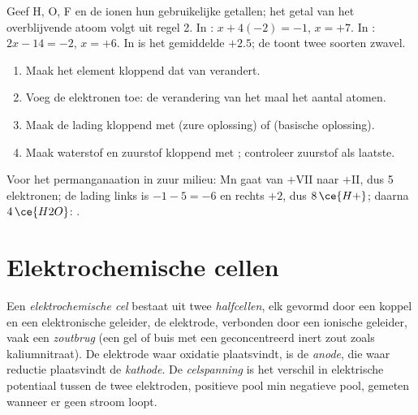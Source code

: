 \begin{method}\label{met:b1:nernst:oxidation-numbers}
Geef H, O, F en de ionen hun gebruikelijke getallen; het getal van het
overblijvende atoom volgt uit regel 2. In : $x + 4(-2) = -1$,
$x = +7$. In : $2x - 14 = -2$, $x = +6$. In  is
het gemiddelde $+2.5$; de  toont twee soorten zwavel.
\end{method}

\begin{method}\label{met:b1:nernst:balance-by-on}
\begin{enumerate}
  \item Maak het element kloppend dat van  verandert.
  \item Voeg de elektronen toe: de verandering van het  maal
        het aantal atomen.
  \item Maak de lading kloppend met  (zure oplossing) of 
        (basische oplossing).
  \item Maak waterstof en zuurstof kloppend met ; controleer
        zuurstof als laatste.
\end{enumerate}
Voor het permanganaation in zuur milieu: Mn gaat van $+$VII naar $+$II,
dus 5 elektronen; de lading links is $-1 - 5 = -6$ en rechts $+2$, dus
$8\,\ce{H+}$; daarna $4\,\ce{H2O}$:
.
\end{method}

\section{Elektrochemische cellen}

\begin{definition}\label{def:b1:nernst:cell}
Een \emph{elektrochemische cel} bestaat uit
twee \emph{halfcellen}, elk gevormd door een koppel en een
elektronische geleider, de elektrode, verbonden door een ionische
geleider, vaak een \emph{zoutbrug} (een gel of buis met
een geconcentreerd inert zout zoals kaliumnitraat). De elektrode waar
oxidatie plaatsvindt, is de \emph{anode}, die waar reductie
plaatsvindt de \emph{kathode}. De
\emph{celspanning} is het verschil in elektrische
potentiaal tussen de twee elektroden, positieve pool min negatieve pool,
gemeten wanneer er geen stroom loopt.
\end{definition}

